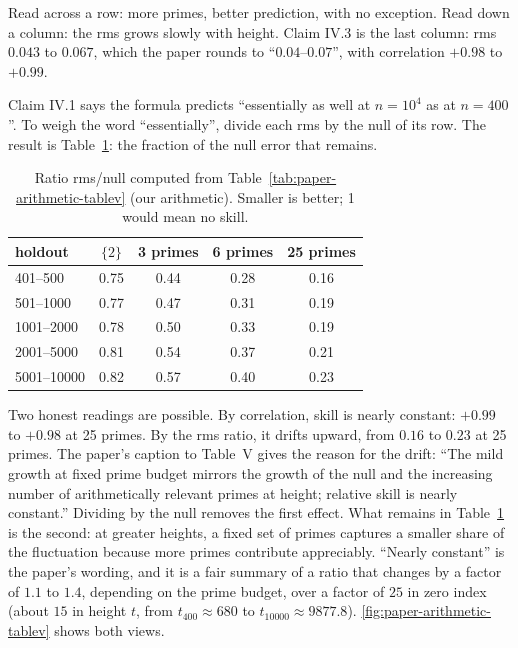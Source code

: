 Read across a row: more primes, better prediction, with no exception. Read down a column: the rms grows slowly with height. Claim IV.3 is the last column: rms $0.043$ to $0.067$, which the paper rounds to ``$0.04$--$0.07$'', with correlation $+0.98$ to $+0.99$.

Claim IV.1 says the formula predicts ``essentially as well at $n=10^4$ as at $n=400$''. To weigh the word ``essentially'', divide each rms by the null of its row. The result is Table~\ref{tab:paper-arithmetic-ratio}: the fraction of the null error that remains.

\begin{table}[htbp]\centering\small
\caption{Ratio rms/null computed from Table~\ref{tab:paper-arithmetic-tablev} (our arithmetic). Smaller is better; 1 would mean no skill.}\label{tab:paper-arithmetic-ratio}
\begin{tabular}{lcccc}
\toprule
holdout & $\{2\}$ & 3 primes & 6 primes & 25 primes \\
\midrule
401--500 & 0.75 & 0.44 & 0.28 & 0.16 \\
501--1000 & 0.77 & 0.47 & 0.31 & 0.19 \\
1001--2000 & 0.78 & 0.50 & 0.33 & 0.19 \\
2001--5000 & 0.81 & 0.54 & 0.37 & 0.21 \\
5001--10000 & 0.82 & 0.57 & 0.40 & 0.23 \\
\bottomrule
\end{tabular}
\end{table}

Two honest readings are possible. By correlation, skill is nearly constant: $+0.99$ to $+0.98$ at 25 primes. By the rms ratio, it drifts upward, from $0.16$ to $0.23$ at 25 primes. The paper's caption to Table~V gives the reason for the drift: ``The mild growth at fixed prime budget mirrors the growth of the null and the increasing number of arithmetically relevant primes at height; relative skill is nearly constant.'' Dividing by the null removes the first effect. What remains in Table~\ref{tab:paper-arithmetic-ratio} is the second: at greater heights, a fixed set of primes captures a smaller share of the fluctuation because more primes contribute appreciably. ``Nearly constant'' is the paper's wording, and it is a fair summary of a ratio that changes by a factor of $1.1$ to $1.4$, depending on the prime budget, over a factor of $25$ in zero index (about $15$ in height $t$, from $t_{400}\approx680$ to $t_{10000}\approx9877.8$). \cref{fig:paper-arithmetic-tablev} shows both views.

